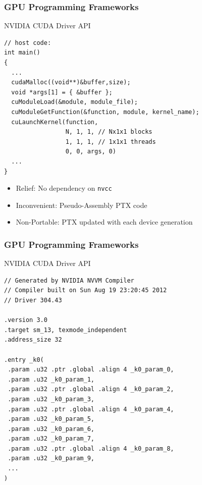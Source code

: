 \begin{frame}[fragile]
\frametitle{GPU Programming Frameworks}
 \begin{block}{NVIDIA CUDA Driver API}
  \begin{lstlisting}
// host code:
int main()
{ 
  ...  
  cudaMalloc((void**)&buffer,size);
  void *args[1] = { &buffer };
  cuModuleLoad(&module, module_file);
  cuModuleGetFunction(&function, module, kernel_name);
  cuLaunchKernel(function, 
                 N, 1, 1, // Nx1x1 blocks
                 1, 1, 1, // 1x1x1 threads
                 0, 0, args, 0)
  ...
}
  \end{lstlisting} 

  \begin{itemize}
   \item {\color{darkgreen}Relief}: No dependency on \lstinline|nvcc|
   \item {\color{darkred}Inconvenient}: Pseudo-Assembly PTX code
   \item {\color{darkred}Non-Portable}: PTX updated with each device generation
  \end{itemize}
 \end{block}

\end{frame}

\begin{frame}[fragile]
\frametitle{GPU Programming Frameworks}
 \begin{block}{NVIDIA CUDA Driver API}
  \begin{lstlisting}
// Generated by NVIDIA NVVM Compiler
// Compiler built on Sun Aug 19 23:20:45 2012
// Driver 304.43

.version 3.0
.target sm_13, texmode_independent
.address_size 32

.entry _k0(
 .param .u32 .ptr .global .align 4 _k0_param_0,
 .param .u32 _k0_param_1,
 .param .u32 .ptr .global .align 4 _k0_param_2,
 .param .u32 _k0_param_3,
 .param .u32 .ptr .global .align 4 _k0_param_4,
 .param .u32 _k0_param_5,
 .param .u32 _k0_param_6,
 .param .u32 _k0_param_7,
 .param .u32 .ptr .global .align 4 _k0_param_8,
 .param .u32 _k0_param_9,
 ...
)
  \end{lstlisting} 
 \end{block}

\end{frame}



